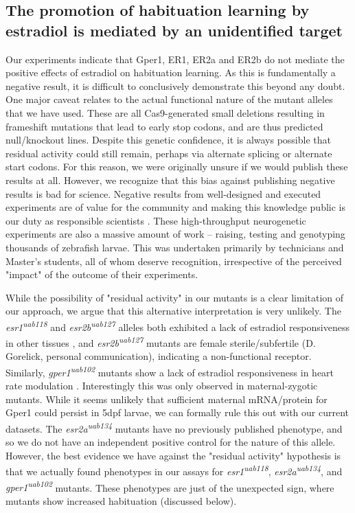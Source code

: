 \documentclass[10pt,lineno]{RandlettLab_elife}
\begin{document}
{\subsection{The promotion of habituation learning by estradiol is mediated by an unidentified target} 
Our experiments indicate that Gper1, ER1, ER2a and ER2b do not mediate the positive effects of estradiol on habituation learning. 
As this is fundamentally a negative result, it is difficult to conclusively demonstrate this beyond any doubt. 
One major caveat relates to the actual functional nature of the mutant alleles that we have used. 
These are all Cas9-generated small deletions resulting in frameshift mutations that lead to early stop codons, and are thus predicted null/knockout lines. 
Despite this genetic confidence, it is always possible that residual activity could still remain, perhaps via alternate splicing or alternate start codons. 
For this reason, we were originally unsure if we would publish these results at all.
However, we recognize that this bias against publishing negative results is bad for science. 
Negative results from well-designed and executed experiments are of value for the community and making this knowledge public is our duty as responsible scientists \citep{Mlinaric2017-kr}. 
These high-throughput neurogenetic experiments are also a massive amount of work -- raising, testing and genotyping thousands of zebrafish larvae.
This was undertaken primarily by technicians and Master's students, all of whom deserve recognition, irrespective of the perceived "impact" of the outcome of their experiments.

While the possibility of "residual activity" in our mutants is a clear limitation of our approach, we argue that this alternative interpretation is very unlikely. The \emph{esr1\textsuperscript{uab118}} and \emph{esr2b\textsuperscript{uab127}} alleles both exhibited a lack of estradiol responsiveness in other tissues \citep{Romano2017-ep}, and \emph{esr2b\textsuperscript{uab127}} mutants are female sterile/subfertile (D. Gorelick, personal communication), indicating a non-functional receptor.
Similarly, \emph{gper1\textsuperscript{uab102}} mutants show a lack of estradiol responsiveness in heart rate modulation \citep{Romano2017-ep}. 
Interestingly this was only observed in maternal-zygotic mutants. 
While it seems unlikely that sufficient maternal mRNA/protein for Gper1 could persist in 5dpf larvae, we can formally rule this out with our current datasets. 
The \emph{esr2a\textsuperscript{uab134}} mutants have no previously published phenotype, and so we do not have an independent positive control for the nature of this allele. However, the best evidence we have against the "residual activity" hypothesis is that we actually found phenotypes in our assays for \emph{esr1\textsuperscript{uab118}}, \emph{esr2a\textsuperscript{uab134}},  and \emph{gper1\textsuperscript{uab102}} mutants. 
These phenotypes are just of the unexpected sign, where mutants show increased habituation (discussed below). 

}
\end{document}
